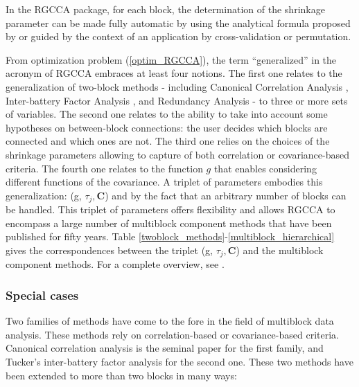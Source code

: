 \documentclass[
]{jss}
\begin{document}
In the RGCCA package, for each block, the determination of the shrinkage
parameter can be made fully automatic by using the analytical formula
proposed by \cite{Schafer2005} or guided by the context of an
application by cross-validation or permutation.

From optimization problem (\ref{optim_RGCCA}), the term ``generalized''
in the acronym of RGCCA embraces at least four notions. The first one
relates to the generalization of two-block methods - including Canonical
Correlation Analysis \citep{Hotelling1936}, Inter-battery Factor
Analysis \citep{Tucker1958}, and Redundancy Analysis
\citep{Wollenberg1977} - to three or more sets of variables. The second
one relates to the ability to take into account some hypotheses on
between-block connections: the user decides which blocks are connected
and which ones are not. The third one relies on the choices of the
shrinkage parameters allowing to capture of both correlation or
covariance-based criteria. The fourth one relates to the function \(g\)
that enables considering different functions of the covariance. A
triplet of parameters embodies this generalization: (g,
\(\tau_j, \mathbf C\)) and by the fact that an arbitrary number of
blocks can be handled. This triplet of parameters offers flexibility and
allows RGCCA to encompass a large number of multiblock component methods
that have been published for fifty years. Table
\ref{twoblock_methods}-\ref{multiblock_hierarchical} gives the
correspondences between the triplet (g, \(\tau_j, \mathbf C\)) and the
multiblock component methods. For a complete overview, see
\cite{Tenenhaus2017}.

\hypertarget{special-cases}{%
\subsubsection{Special cases}\label{special-cases}}

Two families of methods have come to the fore in the field of multiblock
data analysis. These methods rely on correlation-based or
covariance-based criteria. Canonical correlation analysis
\citep{Hotelling1936} is the seminal paper for the first family, and
Tucker's inter-battery factor analysis \citep{Tucker1958} for the second
one. These two methods have been extended to more than two blocks in
many ways:
\end{document}
